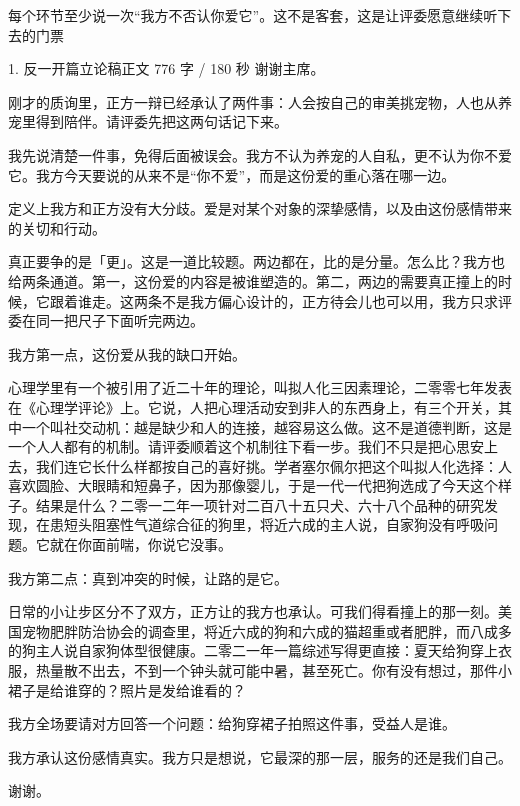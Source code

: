 \documentclass[script,con]{debate}
\begin{document}
\debatetitle
\begin{thesisbox}[全队第一纪律]每个环节至少说一次“我方不否认你爱它”。这不是客套，这是让评委愿意继续听下去的门票\end{thesisbox}
\begin{speech}{1. 反一开篇立论稿}{正文 776 字 / 180 秒}
谢谢主席。

刚才的质询里，正方一辩已经承认了两件事：人会按自己的审美挑宠物，人也从养宠里得到陪伴。请评委先把这两句话记下来。

我先说清楚一件事，免得后面被误会。我方不认为养宠的人自私，更不认为你不爱它。我方今天要说的从来不是“你不爱”，而是这份爱的重心落在哪一边。

定义上我方和正方没有大分歧。爱是对某个对象的深挚感情，以及由这份感情带来的关切和行动。

真正要争的是「更」。这是一道比较题。两边都在，比的是分量。怎么比？我方也给两条通道。第一，这份爱的内容是被谁塑造的。第二，两边的需要真正撞上的时候，它跟着谁走。这两条不是我方偏心设计的，正方待会儿也可以用，我方只求评委在同一把尺子下面听完两边。

我方第一点，这份爱从我的缺口开始。

心理学里有一个被引用了近二十年的理论，叫拟人化三因素理论，二零零七年发表在《心理学评论》上。它说，人把心理活动安到非人的东西身上，有三个开关，其中一个叫社交动机：越是缺少和人的连接，越容易这么做。这不是道德判断，这是一个人人都有的机制。请评委顺着这个机制往下看一步。我们不只是把心思安上去，我们连它长什么样都按自己的喜好挑。学者塞尔佩尔把这个叫拟人化选择：人喜欢圆脸、大眼睛和短鼻子，因为那像婴儿，于是一代一代把狗选成了今天这个样子。结果是什么？二零一二年一项针对二百八十五只犬、六十八个品种的研究发现，在患短头阻塞性气道综合征的狗里，将近六成的主人说，自家狗没有呼吸问题。它就在你面前喘，你说它没事。

我方第二点：真到冲突的时候，让路的是它。

日常的小让步区分不了双方，正方让的我方也承认。可我们得看撞上的那一刻。美国宠物肥胖防治协会的调查里，将近六成的狗和六成的猫超重或者肥胖，而八成多的狗主人说自家狗体型很健康。二零二一年一篇综述写得更直接：夏天给狗穿上衣服，热量散不出去，不到一个钟头就可能中暑，甚至死亡。你有没有想过，那件小裙子是给谁穿的？照片是发给谁看的？

我方全场要请对方回答一个问题：给狗穿裙子拍照这件事，受益人是谁。

我方承认这份感情真实。我方只是想说，它最深的那一层，服务的还是我们自己。

谢谢。

\begin{contingency}
\end{contingency}
\end{speech}
\end{document}

